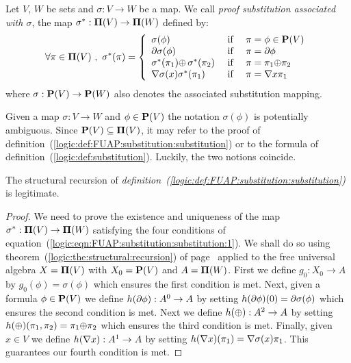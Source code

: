 \begin{defin}\label{logic:def:FUAP:substitution:substitution}
Let $V$, $W$ be sets and $\sigma:V\to W$ be a map. We call {\em
proof substitution associated with $\sigma$}, the map
$\sigma^{*}:\mbox{${\bf\Pi}(V)$}\to{\bf \Pi}(W)$ defined by:
    \begin{equation}\label{logic:eqn:FUAP:substitution:substitution:1}
    \forall\pi\in\pvs\ ,\ \sigma^{*}(\pi)=\left\{
                    \begin{array}{lcl}
                    \sigma(\phi)&\mbox{\ if\ }&\pi=\phi\in\pv\\
                    \axi\sigma(\phi)&\mbox{\ if\ }&\pi=\axi\phi\\
                    \sigma^{*}(\pi_{1})\pon\,\sigma^{*}(\pi_{2})
                    &\mbox{\ if\ }&\pi=\pi_{1}\pon\pi_{2}\\
                    \gen \sigma(x)\sigma^{*}(\pi_{1})&\mbox{\ if\ }&\pi=\gen
                    x\pi_{1}\\
                    \end{array}\right.
    \end{equation}
where $\sigma:\mbox{${\bf P}(V)$}\to{\bf P}(W)$ also denotes the associated
substitution mapping.
\end{defin}
Given a map $\sigma:V\to W$ and $\phi\in\mbox{${\bf P}(V)$}$ the notation
$\sigma(\phi)$ is potentially ambiguous. Since $\mbox{${\bf P}(V)$}\subseteq\mbox{${\bf\Pi}(V)$}$,
it may refer to the proof of
definition~(\ref{logic:def:FUAP:substitution:substitution}) or to
the formula of definition~(\ref{logic:def:substitution}). Luckily,
the two notions coincide.
\begin{prop}
The structural recursion of {\em
definition~(\ref{logic:def:FUAP:substitution:substitution})} is
legitimate.
\end{prop}
\begin{proof}
We need to prove the existence and uniqueness of the map
$\sigma^{*}:\mbox{${\bf\Pi}(V)$}\to{\bf \Pi}(W)$ satisfying the four conditions of
equation~(\ref{logic:eqn:FUAP:substitution:substitution:1}). We
shall do so using theorem~(\ref{logic:the:structural:recursion}) of
page~\pageref{logic:the:structural:recursion} applied to the free
universal algebra $X=\mbox{${\bf\Pi}(V)$}$ with $X_{0}=\mbox{${\bf P}(V)$}$ and $A={\bf\Pi}(W)$.
First we define $g_{0}:X_{0}\to A$ by $g_{0}(\phi)=\sigma(\phi)$
which ensures the first condition is met. Next, given a formula
$\phi\in\mbox{${\bf P}(V)$}$ we define $h(\mbox{$\partial$}\phi):A^{0}\to A$ by setting
$h(\mbox{$\partial$}\phi)(0)=\mbox{$\partial$}\sigma(\phi)$ which ensures the second condition
is met. Next we define $h(\mbox{$\oplus$}):A^{2}\to A$ by setting
$h(\mbox{$\oplus$})(\pi_{1},\pi_{2})=\pi_{1}\mbox{$\oplus$}\pi_{2}$ which ensures the
third condition is met. Finally, given $x\in V$ we define $h(\mbox{$\nabla$}
x):A^{1}\to A$ by setting $h(\mbox{$\nabla$} x)(\pi_{1})=\mbox{$\nabla$}\sigma(x)\pi_{1}$.
This guarantees our fourth condition is met.
\end{proof}

